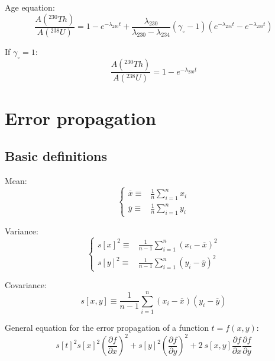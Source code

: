 \documentclass{article}
\begin{document}
\begin{multicols}{3}
Age equation:
\begin{equation}
  \frac{A(^{230}Th)}{A(^{238}U)} = 1 - e^{-\lambda_{230}t} +
  \frac{\lambda_{230}}{\lambda_{230}-\lambda_{234}} (\gamma_\circ-1)
\left(e^{-\lambda_{234}t}-e^{-\lambda_{230}t}\right)
\label{eq:230238}
\end{equation}

If $\gamma_\circ = 1$:
\begin{equation}
\frac{A(^{230}Th)}{A(^{238}U)} = 1-e^{-\lambda_{230}t}
\label{eq:230238b}
\end{equation}

\section{Error propagation}
\label{ch:error-propagation}

\subsection{Basic definitions}
\label{sec:summarystatistics}

Mean:
\begin{equation}
\left\{
\begin{array}{rl}
\overline{x} \equiv & \frac{1}{n} \sum_{i=1}^{n} x_i\\
\overline{y} \equiv & \frac{1}{n} \sum_{i=1}^{n} y_i
\end{array}
\right.
\label{eq:mean}
\end{equation}

Variance:
\begin{equation}
\left\{
\begin{array}{rl}
s[x]^2 \equiv & \frac{1}{n-1} \sum_{i=1}^{n} (x_i-\overline{x})^2\\
s[y]^2 \equiv & \frac{1}{n-1} \sum_{i=1}^{n} (y_i-\overline{y})^2
\end{array}
\right.
\label{eq:variance}
\end{equation}

Covariance:
\begin{equation}
s[x,y] \equiv \frac{1}{n-1} \sum_{i=1}^{n} (x_i-\overline{x})(y_i-\overline{y})
\label{eq:covariance}
\end{equation}

General equation for the error propagation of a function $t=f(x,y)$:
\begin{equation}
s[t]^2 s[x]^2 \left(\frac{\partial f}{\partial x}\right)^2 +
s[y]^2 \left(\frac{\partial f}{\partial y}\right)^2 +
2~s[x,y] \frac{\partial f}{\partial x} \frac{\partial f}{\partial y} \label{eq:s2t}
\end{equation}


\end{multicols}
\end{document}
